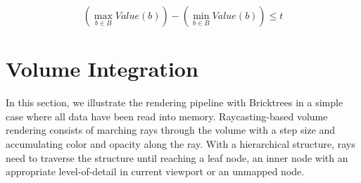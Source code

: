 \begin{equation} \label{eq:collapse_thresh}
\left(\max_{b \in B} Value(b)\right) - \left(\min_{b \in B} Value(b)\right) \leq t
\end{equation}



\section{Volume Integration}
In this section, we illustrate the rendering pipeline with Bricktrees in a
simple case where all data have been read into memory.  
Raycasting-based volume rendering consists of marching rays through the volume with
a step size and accumulating color and opacity along the ray. With a hierarchical
structure, rays need to traverse the structure until reaching a leaf node, an inner
node with an appropriate level-of-detail in current viewport or an unmapped node. 


